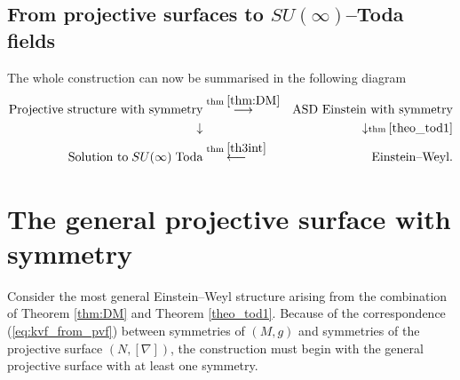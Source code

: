 
\subsection{From projective surfaces to $SU(\infty)$--Toda fields}
The whole construction can now be summarised in the following diagram
\begin{eqnarray}
\label{diagram}
\text{Projective structure with symmetry} &\overset{\text{thm}\;\ref{thm:DM}}
{\longrightarrow}& \text{ASD Einstein with symmetry}\nonumber\\
\downarrow & & \downarrow \scriptstyle{\text{thm}\;\ref{theo_tod1}}\\
\text{Solution to}\;SU(\infty)\; \text{Toda} &\overset{\text{thm}\;\ref{th3int}}\longleftarrow&\text{Einstein--Weyl.}\nonumber
\end{eqnarray}

\section{The general projective surface with symmetry}
\label{general}

Consider the most general Einstein--Weyl structure arising from the combination
of Theorem \ref{thm:DM} and Theorem \ref{theo_tod1}. Because of the correspondence (\ref{eq:kvf_from_pvf}) between symmetries of $(M, g)$ and symmetries of the projective surface $(N, [\nabla])$, the construction must begin with the general projective surface with at least one symmetry. 
 
